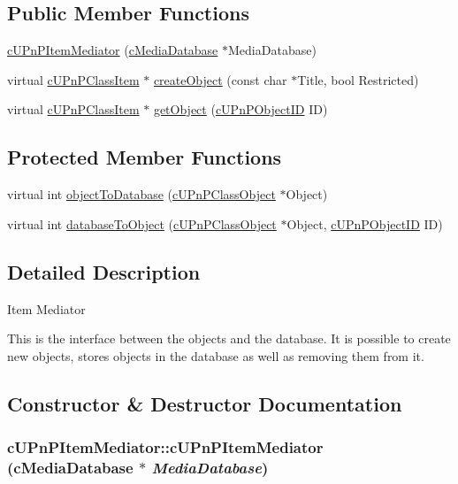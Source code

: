 \subsection*{Public Member Functions}
\begin{CompactItemize}
\item 
\hyperlink{classcUPnPItemMediator_99ec31552ae8e4d52da6920ff959c133}{cUPnPItemMediator} (\hyperlink{classcMediaDatabase}{cMediaDatabase} $\ast$MediaDatabase)
\item 
virtual \hyperlink{classcUPnPClassItem}{cUPnPClassItem} $\ast$ \hyperlink{classcUPnPItemMediator_e2fd4cf5e6435f1eeadd11f9a99cd2db}{createObject} (const char $\ast$Title, bool Restricted)
\item 
virtual \hyperlink{classcUPnPClassItem}{cUPnPClassItem} $\ast$ \hyperlink{classcUPnPItemMediator_81411b2a472ade71d73a9c8ddc2a7990}{getObject} (\hyperlink{structcUPnPObjectID}{cUPnPObjectID} ID)
\end{CompactItemize}
\subsection*{Protected Member Functions}
\begin{CompactItemize}
\item 
virtual int \hyperlink{classcUPnPItemMediator_6d954b1cfdc4a7d55981c6ebff9d6d04}{objectToDatabase} (\hyperlink{classcUPnPClassObject}{cUPnPClassObject} $\ast$Object)
\item 
virtual int \hyperlink{classcUPnPItemMediator_1f3645ebe0a33a81d0b3f22060dc4761}{databaseToObject} (\hyperlink{classcUPnPClassObject}{cUPnPClassObject} $\ast$Object, \hyperlink{structcUPnPObjectID}{cUPnPObjectID} ID)
\end{CompactItemize}


\subsection{Detailed Description}
Item Mediator

This is the interface between the objects and the database. It is possible to create new objects, stores objects in the database as well as removing them from it. 

\subsection{Constructor \& Destructor Documentation}
\hypertarget{classcUPnPItemMediator_99ec31552ae8e4d52da6920ff959c133}{
\subsubsection[{cUPnPItemMediator}]{\setlength{\rightskip}{0pt plus 5cm}cUPnPItemMediator::cUPnPItemMediator ({\bf cMediaDatabase} $\ast$ {\em MediaDatabase})}}
\label{classcUPnPItemMediator_99ec31552ae8e4d52da6920ff959c133}


